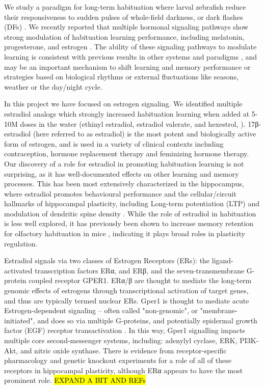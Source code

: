 \documentclass[9pt,lineno]{RandlettLab_elife}
\begin{document}
We study a paradigm for long-term habituation where larval zebrafish reduce their responsiveness to sudden pulses of whole-field darkness, or dark flashes (DFs) \citep{wolman_chemical_2011, Randlett2019-fj, Lamire2023-he}. 
We recently reported that multiple hormonal signaling pathways show strong modulation of habituation learning performance, including melatonin, progesterone, and estrogen \citep{Lamire2023-he}. 
The ability of these signaling pathways to modulate learning is consistent with previous results in other systems and paradigms \citep{Nilsson2002-as, Naderi2020-ot, Dillon2013-rk, Rawashdeh2007-bw, Jilg2019-oy, El-Sherif2003-vt, Barros2015-jm}, and may be an important mechanism to shift learning and memory performance or strategies based on biological rhythms or external fluctuations like seasons, weather or the day/night cycle.

In this project we have focused on estrogen signaling. 
We identified multiple estradiol analogs which strongly increased habituation learning when added at 5-10\textmu M doses in the water (ethinyl estradiol, estradiol valerate, and hexestrol, \citealp{Lamire2023-he}).
17β-estradiol (here referred to as estradiol) is the most potent and biologically active form of estrogen, and is used in a variety of clinical contexts including contraception, hormone replacement therapy and feminizing hormone therapy. 
Our discovery of a role for estradiol in promoting habituation learning is not surprising, as it has well-documented effects on other learning and memory processes. 
This has been most extensively characterized in the hippocampus, where estradiol promotes behavioural performance and the cellular/circuit hallmarks of hippocampal plasticity, including Long-term potentiation (LTP) and modulation of dendritic spine density \citep{Iqbal2024-yo, Luine2014-cj, Finney2020-ng, Nilsson2002-hs}. 
While the role of estradiol in habituation is less well explored, it has previously been shown to increase memory retention for olfactory habituation in mice \citep{Dillon2013-rk}, indicating it plays broad roles in plasticity regulation.

Estradiol signals via two classes of Estrogen Receptors (ERs): the ligand-activated transcription factors ERα, and ERβ, and the seven-transmembrane G-protein coupled receptor GPER1.
ERα/β are thought to mediate the long-term genomic effects of estrogens through transcriptional activation of target genes, and thus are typically termed nuclear ERs.
Gper1 is thought to mediate acute Estrogen-dependent signaling -- often called "non-genomic", or "membrane-initiated", and does so via multiple G-proteins, and potentially epidermal growth factor (EGF) receptor transactivation \citep{Prossnitz2023-uo, Revankar2005-ww, Filardo2000-yz}.
In this way, Gper1 signalling impacts multiple core second-messenger systems, including: adenylyl cyclase, ERK, PI3K-Akt, and nitric oxide synthase. 
There is evidence from receptor-specific pharmacology and genetic knockout experiments for a role of all of these receptors in hippocampal plasticity, although ERα appears to have the most prominent role. \hl{EXPAND A BIT AND REFs}
\end{document}
